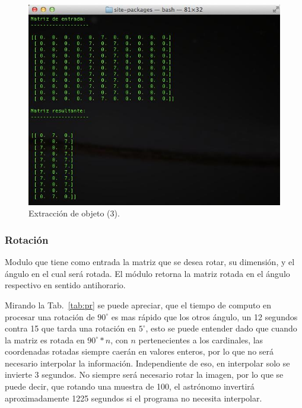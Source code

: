 \begin{figure}[ht!]
	\centering
	\includegraphics[scale=.5]{img/eo3}
	\caption{Extracción de objeto (3).}\label{img:eo3}
\end{figure}


\subsubsection{Rotación}

Modulo que tiene como entrada la matriz que se desea rotar, su dimensión, y el ángulo en el cual será rotada. El módulo retorna la matriz rotada en el ángulo respectivo en sentido antihorario.

Mirando la Tab.~\ref{tab:pr} se puede apreciar, que el tiempo de computo en procesar una rotación de $90^\circ$ es mas rápido que los otros ángulo, un 12 segundos contra 15 que tarda una rotación en $5^\circ$, esto se puede entender dado que cuando la matriz es rotada en $90^\circ * n$, con $n$ pertenecientes a los cardinales, las coordenadas rotadas siempre caerán en valores enteros, por lo que no será necesario interpolar la información. Independiente de eso, en interpolar solo se invierte 3 segundos. No siempre será necesario rotar la imagen, por lo que se puede decir, que rotando una muestra de 100, el astrónomo invertirá aproximadamente 1225 segundos si el programa no necesita interpolar.

